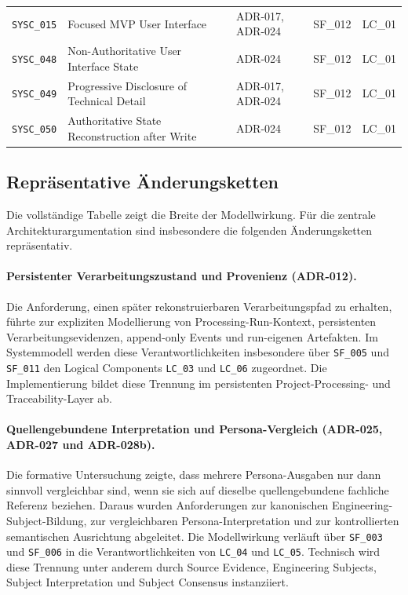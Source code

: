 \begin{xltabular}{\textwidth}{@{}p{1.65cm}X p{2.25cm}p{2.0cm}p{1.7cm}@{}}
\texttt{SYSC\_015} & Focused MVP User Interface & ADR-017, ADR-024 & SF\_012 & LC\_01\\

\texttt{SYSC\_048} & Non-Authoritative User Interface State & ADR-024 & SF\_012 & LC\_01\\

\texttt{SYSC\_049} & Progressive Disclosure of Technical Detail & ADR-017, ADR-024 & SF\_012 & LC\_01\\

\texttt{SYSC\_050} & Authoritative State Reconstruction after Write & ADR-024 & SF\_012 & LC\_01\\

\hline
\end{xltabular}
\endgroup

\subsection{Repräsentative Änderungsketten}
\label{app:adr_change_chains}

Die vollständige Tabelle zeigt die Breite der Modellwirkung. Für die zentrale
Architekturargumentation sind insbesondere die folgenden Änderungsketten
repräsentativ.

\paragraph{Persistenter Verarbeitungszustand und Provenienz (ADR-012).}
Die Anforderung, einen später rekonstruierbaren Verarbeitungspfad zu erhalten,
führte zur expliziten Modellierung von Processing-Run-Kontext, persistenten
Verarbeitungsevidenzen, append-only Events und run-eigenen Artefakten. Im
Systemmodell werden diese Verantwortlichkeiten insbesondere über
\texttt{SF\_005} und \texttt{SF\_011} den Logical Components
\texttt{LC\_03} und \texttt{LC\_06} zugeordnet. Die Implementierung bildet
diese Trennung im persistenten Project-Processing- und Traceability-Layer ab.

\paragraph{Quellengebundene Interpretation und Persona-Vergleich
(ADR-025, ADR-027 und ADR-028b).}
Die formative Untersuchung zeigte, dass mehrere Persona-Ausgaben nur dann
sinnvoll vergleichbar sind, wenn sie sich auf dieselbe quellengebundene
fachliche Referenz beziehen. Daraus wurden Anforderungen zur kanonischen
Engineering-Subject-Bildung, zur vergleichbaren Persona-Interpretation und zur
kontrollierten semantischen Ausrichtung abgeleitet. Die Modellwirkung verläuft
über \texttt{SF\_003} und \texttt{SF\_006} in die Verantwortlichkeiten von
\texttt{LC\_04} und \texttt{LC\_05}. Technisch wird diese Trennung unter
anderem durch Source Evidence, Engineering Subjects, Subject Interpretation
und Subject Consensus instanziiert.

